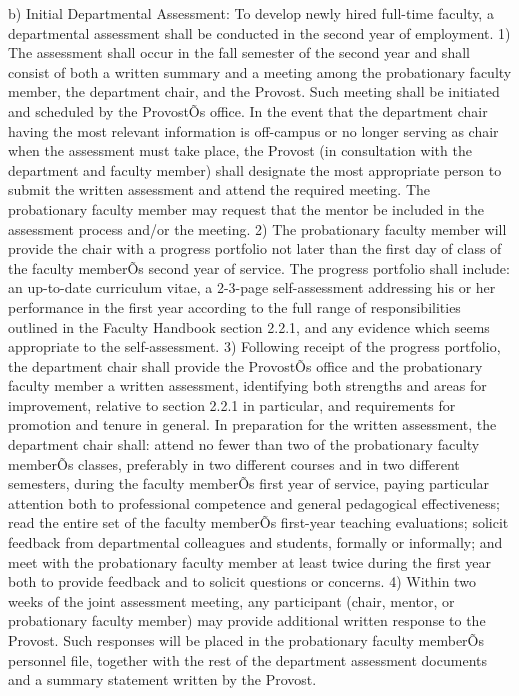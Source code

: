 \documentclass[letterpaper, 11pt]{article}
\begin{document}
b) Initial Departmental Assessment:  To develop newly hired full-time faculty, a departmental assessment shall be conducted in the second year of employment.
1) The assessment shall occur in the fall semester of the second year and shall consist of both a written summary and a meeting among the probationary faculty member, the department chair, and the Provost.  Such meeting shall be initiated and scheduled by the ProvostÕs office.  In the event that the department chair having the most relevant information is off-campus or no longer serving as chair when the assessment must take place, the Provost (in consultation with the department and faculty member) shall designate the most appropriate person to submit the written assessment and attend the required meeting.  The probationary faculty member may request that the mentor be included in the assessment process and/or the meeting.
2) The probationary faculty member will provide the chair with a progress portfolio not later than the first day of class of the faculty memberÕs second year of service. The progress portfolio shall include:  an up-to-date curriculum vitae, a 2-3-page self-assessment addressing his or her performance in the first year according to the full range of responsibilities outlined in the Faculty Handbook section 2.2.1, and any evidence which seems appropriate to the self-assessment.
3) Following receipt of the progress portfolio, the department chair shall provide the ProvostÕs office and the probationary faculty member a written assessment, identifying both strengths and areas for improvement, relative to section 2.2.1 in particular, and requirements for promotion and tenure in general.  In preparation for the written assessment, the department chair shall:  attend no fewer than two of the probationary faculty memberÕs classes, preferably in two different courses and in two different semesters, during the faculty memberÕs first year of service, paying particular attention both to professional competence and general pedagogical effectiveness; read the entire set of the faculty memberÕs first-year teaching evaluations; solicit feedback from departmental colleagues and students, formally or informally; and meet with the probationary faculty member at least twice during the first year both to provide feedback and to solicit questions or concerns.
4) Within two weeks of the joint assessment meeting, any participant (chair, mentor, or probationary faculty member) may provide additional written response to the Provost.  Such responses will be placed in the probationary faculty memberÕs personnel file, together with the rest of the department assessment documents and a summary statement written by the Provost.
\end{document}
